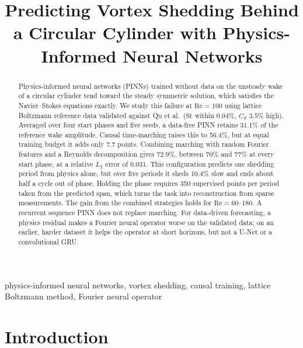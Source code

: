 \documentclass[conference]{IEEEtran}
\newcommand{\Rey}{\mathrm{Re}}
\newcommand{\St}{\mathrm{St}}
\newcommand{\Cd}{C_d}
\begin{document}
\title{Predicting Vortex Shedding Behind a Circular Cylinder with
Physics-Informed Neural Networks}

\author{
}

\maketitle

\begin{abstract}
Physics-informed neural networks (PINNs) trained without data on the unsteady
wake of a circular cylinder tend toward the steady symmetric solution, which
satisfies the Navier--Stokes equations exactly. We study this failure at
$\Rey = 100$ using lattice Boltzmann reference data validated against Qu et
al.\ ($\St$ within $0.04\%$, $\Cd$ $3.5\%$ high). Averaged over four start
phases and five seeds, a data-free PINN retains 31.1\% of the reference wake
amplitude. Causal time-marching raises this to 56.4\%, but at equal training
budget it adds only 7.7 points. Combining marching with random Fourier
features and a Reynolds decomposition gives 72.9\%, between 70\% and 77\% at
every start phase, at a relative $L_2$ error of 0.031. This configuration
predicts one shedding period from physics alone, but over five periods it
sheds 10.4\% slow and ends about half a cycle out of phase. Holding the phase
requires 350 supervised points per period taken from the predicted span, which
turns the task into reconstruction from sparse measurements. The gain from
the combined strategies holds for $\Rey = 60$--$180$. A recurrent sequence
PINN does not replace marching. For data-driven forecasting, a physics
residual makes a Fourier neural operator worse on the validated data; on an
earlier, harder dataset it helps the operator at short horizons, but not a
U-Net or a convolutional GRU.
\end{abstract}

\begin{IEEEkeywords}
physics-informed neural networks, vortex shedding, causal training, lattice
Boltzmann method, Fourier neural operator
\end{IEEEkeywords}

\section{Introduction}
\end{document}
